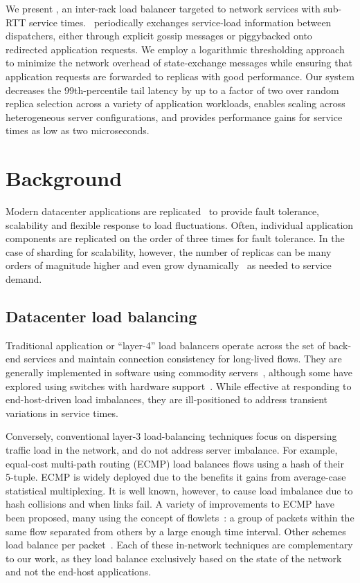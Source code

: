 We present \toolname, an inter-rack load balancer targeted to network
services with sub-RTT service times.  \toolname\ periodically
exchanges service-load information between dispatchers, either through
explicit gossip messages or piggybacked onto redirected application
requests.  We employ a logarithmic thresholding approach to minimize
the network overhead of state-exchange messages while ensuring that
application requests are forwarded to replicas with good performance.
Our system decreases the 99th-percentile tail latency by up to a
factor of two over random replica selection across a variety of
application workloads, enables scaling across heterogeneous server
configurations, and provides performance gains for service times as
low as two microseconds.

\section{Background}
\label{sec:background}


Modern datacenter applications are
replicated~\cite{rocksdb,memcached,mongodb} to provide fault
tolerance, scalability and flexible response to load
fluctuations. Often, individual application components are replicated
on the order of three times for fault tolerance. In the case of
sharding for scalability, however, the number of replicas can be many
orders of magnitude higher and even grow
dynamically~\cite{facebook_shard,google_slicer,microsoft_service_fabric}
as needed to service demand.

\subsection{Datacenter load balancing}
Traditional application or ``layer-4'' load balancers operate across
the set of back-end services and maintain connection consistency for
long-lived flows. They are generally implemented in software using
commodity servers~\cite{cheetah, maglev, beamer, ananta}, although
some have explored using switches with hardware support~\cite{duet,
  silkroad}.  While effective at responding to end-host-driven load
imbalances, they are ill-positioned to address transient
variations in service times.

Conversely, conventional layer-3 load-balancing techniques focus on
dispersing traffic load in the network, and do not address server
imbalance.  For example, equal-cost multi-path routing (ECMP) load
balances flows using a hash of their 5-tuple. ECMP is widely deployed
due to the benefits it gains from average-case statistical
multiplexing.  It is well known, however, to cause load imbalance due
to hash collisions and when links fail.  A variety of improvements to
ECMP have been proposed, many using the concept of
flowlets~\cite{conga, clove, HULA, letitflow}: a group of packets
within the same flow separated from others by a large enough time
interval. Other schemes load balance per
packet~\cite{drill,flowbender,hermes}. Each of these in-network
techniques are complementary to our work, as they load balance
exclusively based on the state of the network and not the end-host
applications.

